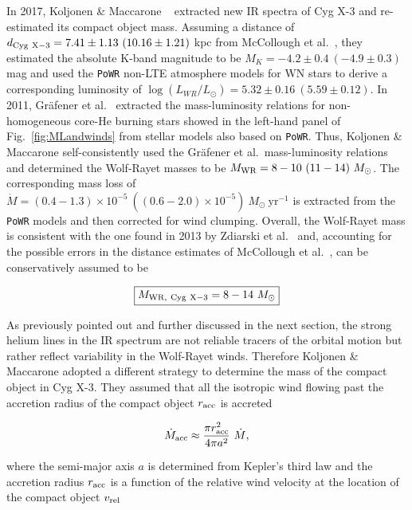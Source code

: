 \documentclass[a4paper,titlepage]{book}     	%
\newcommand{\sun}{\ensuremath{_\odot}}
\newcommand{\mdot}{\ensuremath{\dot{M}}}
\newcommand{\msun}{\ensuremath{M\sun}}
\newcommand{\lsun}{L_{\odot}}
\newcommand{\yr}{\text{yr}}
\newcommand{\mwr}{\ensuremath{M_\textup{WR}}}
\begin{document}
In 2017, Koljonen \& Maccarone \ \cite{CygX-3_Koljonen2017} extracted new IR spectra of Cyg X-3 and re-estimated its compact object mass. Assuming a distance of $d_{\rm Cyg~X-3} = 7.41 \pm 1.13~ (10.16 \pm 1.21)$ kpc from McCollough et al.\ \cite{CygX-3_McCollough2016_Observation}, they estimated the absolute K-band magnitude to be $M_K = -4.2 \pm 0.4~(-4.9 \pm 0.3)$ mag and used the \texttt{PoWR} non-LTE atmosphere models for WN stars \cite{WRnonLTEatmospheresPoWR_Todt2015} to derive a corresponding luminosity of $\log(L_{WR}/\lsun) = 5.32 \pm 0.16~(5.59 \pm 0.12)$. In 2011, Gr{\"a}fener et al.\ \cite{Grafener2011_M-L_WR} extracted the mass-luminosity relations for non-homogeneous core-He burning stars showed in the left-hand panel of Fig.\ \ref{fig:MLandwinds} from stellar models also based on \texttt{PoWR}. Thus, Koljonen \& Maccarone self-consistently used the Gr{\"a}fener et al.\  mass-luminosity relations and determined the Wolf-Rayet masses to be $\mwr = 8-10~(11-14)~\msun$. The corresponding mass loss of $\mdot = (0.4-1.3) \times 10^{-5}~((0.6-2.0)\times 10^{-5})~\msun~\yr^{-1}$ is extracted from the \texttt{PoWR} models and then corrected for wind clumping. Overall, the Wolf-Rayet mass is consistent with the one found in 2013 by Zdiarski et al.\ \cite{Cyg-X3_Zd2013} and, accounting for the possible errors in the distance estimates of McCollough et al.\ \cite{CygX-3_McCollough2016_Observation}, can be conservatively assumed to be

\begin{equation}\label{eq:MWRCygxX-3}
    \boxed{M_{\rm WR,~Cyg~X-3} = 8-14~\msun}
\end{equation}

As previously pointed out and further discussed in the next section, the strong helium lines in the IR spectrum are not reliable tracers of the orbital motion but rather reflect variability in the Wolf-Rayet winds. Therefore Koljonen \& Maccarone adopted a different strategy to determine the mass of the compact object in Cyg X-3. They assumed that all the isotropic wind flowing past the accretion radius of the compact object $r_{\rm acc}$ is accreted

\begin{equation}\label{eq:massaccretedBHCygX3}
    \mdot_{\rm acc} \approx \frac{\pi r_{\rm acc}^2}{4 \pi a^2} ~ \mdot{},
\end{equation}

where the semi-major axis $a$ is determined from Kepler's third law and the accretion radius $r_{\rm acc}$ is a function of the relative wind velocity at the location of the compact object $v_{\rm rel}$
\end{document}
